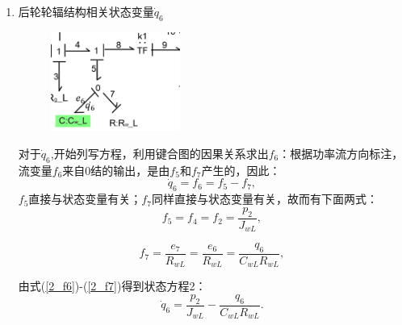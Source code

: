 \begin{enumerate}
\item {后轮轮辐结构相关状态变量$\dot{q}_6 $}
\begin{figure}[H]
	\centering
	\includegraphics[width=0.4\textwidth]{fig/2_equation2.png}
\end{figure}
对于$\dot{q}_{ 6 }$,开始列写方程，利用键合图的因果关系求出$f_6$：根据功率流方向标注，流变量$f_6$来自0结的输出，是由$f_5$和$f_7$产生的，因此：
\begin{equation}\label{2_f6}
\dot{q}_{6}
=
f_6
=
f_5 - f_7,
\end{equation}
$f_5$直接与状态变量有关；$f_7$同样直接与状态变量有关，故而有下面两式：
\begin{equation}\label{2_f5}
f_5
=
f_4
=
f_2
=
\frac{p_{2}}{J_{w L}},
\end{equation}

\begin{equation}\label{2_f7}
f_7
=
\frac{e_{7}}{R_{w L}}
=
\frac{e_{6}}{R_{w L}}
=
\frac{q_{6}}{C_{wL} R_{w L}},
\end{equation}

由式(\ref{2_f6})-(\ref{2_f7})得到状态方程2：
\begin{equation}\label{2_q6}
\dot{q}_{6}
=
\frac{p_{2}}{J_{w L}}-\frac{q_{6}}{C_{wL} R_{w L}}.
\end{equation}


\end{enumerate}
